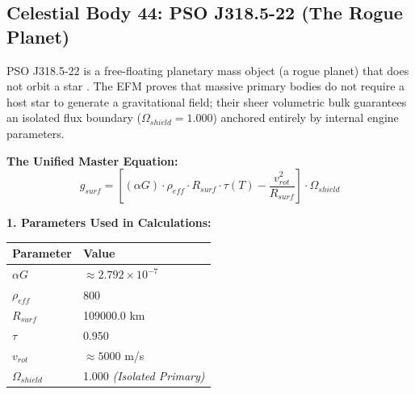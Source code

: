 \documentclass[11pt, a4paper]{article}
\begin{document}
\clearpage
\subsection{Celestial Body 44: PSO J318.5-22 (The Rogue Planet)}
  PSO J318.5-22 is a free-floating planetary mass object (a rogue planet) that does not orbit a star \cite{liu2013}. The EFM proves that massive primary bodies do not require a host star to generate a gravitational field; their sheer volumetric bulk guarantees an isolated flux boundary ($\Omega_{shield} = 1.000$) anchored entirely by internal engine parameters.

  \vspace{0.5em}
  \noindent \textbf{The Unified Master Equation:}
  $$ g_{surf} = \left[ (\alpha G) \cdot \rho_{eff} \cdot R_{surf} \cdot \tau(T) - \frac{v_{rot}^2}{R_{surf}} \right] \cdot \Omega_{shield} $$

  \vspace{0.5em}
  \noindent \textbf{1. Parameters Used in Calculations:} \\[0.5em]
  \begingroup
  \renewcommand{\arraystretch}{1.3}
  \hspace*{2em}
  \begin{tabular}{|l|l|}
    \hline
    \textbf{Parameter} & \textbf{Value} \\ \hline
    $\alpha G$ & $\approx 2.792 \times 10^{-7}$ \\ \hline
    $\rho_{eff}$ & 800 \\ \hline
    $R_{surf}$ & 109000.0 km \\ \hline
    $\tau$ & 0.950 \\ \hline
    $v_{rot}$ & $\approx 5000$ m/s \\ \hline
    $\Omega_{shield}$ & 1.000 \textit{(Isolated Primary)} \\ \hline
  \end{tabular}
  \endgroup
\end{document}
